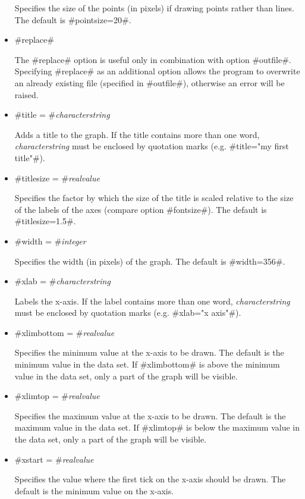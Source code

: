 \begin{itemize}
Specifies the size of the points (in pixels) if drawing points
rather than lines. The default is #pointsize=20#.

\item #replace#

The #replace# option is useful only in combination with option
#outfile#. Specifying #replace# as an additional option allows the
program to overwrite an already existing file (specified in
#outfile#), otherwise an error will be raised.

\item #title = #{\em characterstring}

Adds a title to the graph. If the title contains more than one
word, {\em characterstring} must be enclosed by quotation marks (e.g.
#title="my first title"#).

\item #titlesize = #{\em realvalue}

Specifies the factor by which the size of the title is scaled
relative to the size of the labels of the axes (compare option
#fontsize#). The default is #titlesize=1.5#.

\item #width = #{\em integer}

Specifies the width (in pixels) of the graph. The default is
#width=356#.

\item #xlab = #{\em characterstring}

Labels the x-axis. If the label contains more than one word, {\em
characterstring} must be enclosed by quotation marks (e.g.
#xlab="x axis"#).

\item #xlimbottom = #{\em realvalue}

Specifies the minimum value at the x-axis to be drawn. The default
is the minimum value in the data set. If #xlimbottom# is above the
minimum value in the data set, only a part of the  graph will be
visible.

\item #xlimtop = #{\em realvalue}

Specifies the maximum value at the x-axis to be drawn. The default
is the maximum value in the data set. If #xlimtop# is below the
maximum value in the data set, only a part of the  graph will be
visible.

\item #xstart = #{\em realvalue}

Specifies the value where the first tick on the x-axis should be
drawn. The default is the minimum value on the x-axis.


\end{itemize}

